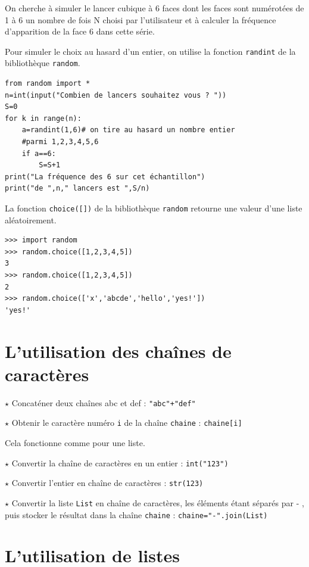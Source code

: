 On cherche à simuler le lancer cubique à 6 faces dont les faces sont numérotées de 1 à 6 un nombre de fois N choisi par l'utilisateur et à calculer la fréquence d'apparition de la face 6 dans cette série.

Pour simuler le choix au hasard d'un entier, on utilise la fonction \verb!randint! de la bibliothèque \verb!random!.

\begin{lstlisting}
from random import *
n=int(input("Combien de lancers souhaitez vous ? "))
S=0
for k in range(n):
    a=randint(1,6)# on tire au hasard un nombre entier 
    #parmi 1,2,3,4,5,6
    if a==6:
        S=S+1
print("La fréquence des 6 sur cet échantillon")
print("de ",n," lancers est ",S/n)
\end{lstlisting}

La fonction \verb!choice([])! de la bibliothèque \verb!random! retourne une valeur d'une liste aléatoirement. 

\begin{lstlisting}
>>> import random
>>> random.choice([1,2,3,4,5])
3
>>> random.choice([1,2,3,4,5])
2
>>> random.choice(['x','abcde','hello','yes!'])
'yes!'
\end{lstlisting}

\section{L'utilisation des chaînes de caractères}

$\star$ Concaténer deux chaînes \og abc\fg{} et \og def\fg{} : \verb~"abc"+"def"~

$\star$ Obtenir le caractère numéro \verb~i~ de la chaîne \verb~chaine~ : \verb~chaine[i]~

Cela fonctionne comme pour une liste.

$\star$ Convertir la chaîne de caractères \fg{} en un entier : \verb~int("123")~

$\star$ Convertir l'entier  \fg{}  en chaîne de caractères : \verb~str(123)~

$\star$ Convertir la liste \verb~List~ en chaîne de caractères, les éléments étant séparés par \og - \fg{}, puis stocker le résultat dans la chaîne \verb~chaine~ : \verb~chaine="-".join(List)~

\section{L'utilisation de listes}


